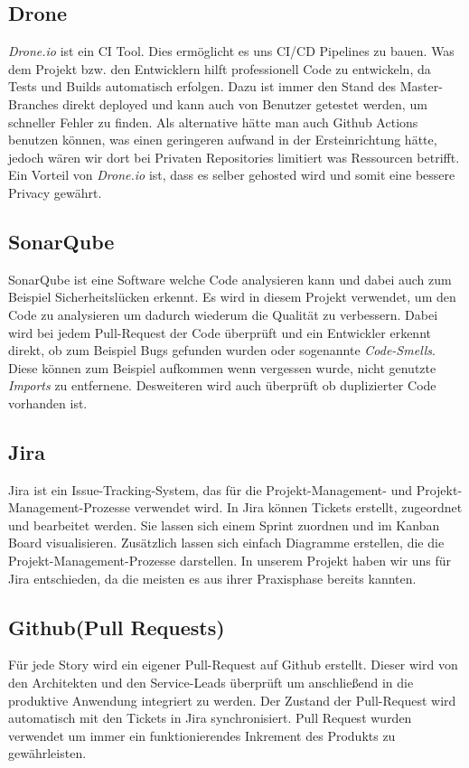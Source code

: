 \subsection{Drone}
    \textit{Drone.io} ist ein \ac{CI} Tool. Dies ermöglicht es uns \ac{CI/CD} Pipelines zu bauen. Was dem Projekt bzw. den Entwicklern hilft professionell Code zu entwickeln, da Tests und Builds automatisch erfolgen.
    Dazu ist immer den Stand des Master-Branches direkt deployed und kann auch von Benutzer getestet werden, um schneller Fehler zu finden. Als alternative hätte man auch Github Actions benutzen können, was einen geringeren
    aufwand in der Ersteinrichtung hätte, jedoch wären wir dort bei Privaten Repositories limitiert was Ressourcen betrifft. Ein Vorteil von \textit{Drone.io} ist, dass es selber gehosted wird und somit eine bessere Privacy gewährt.
\subsection{SonarQube}
    SonarQube ist eine Software welche Code analysieren kann und dabei auch zum Beispiel Sicherheitslücken erkennt.
    Es wird in diesem Projekt verwendet, um den Code zu analysieren um dadurch wiederum die Qualität zu verbessern.
    Dabei wird bei jedem Pull-Request der Code überprüft und ein Entwickler erkennt direkt, ob zum Beispiel Bugs gefunden wurden oder sogenannte \textit{Code-Smells}. 
    Diese können zum Beispiel aufkommen wenn vergessen wurde, nicht genutzte \textit{Imports} zu entfernene.
    Desweiteren wird auch überprüft ob duplizierter Code vorhanden ist.
\subsection{Jira}
    Jira ist ein Issue-Tracking-System, das für die Projekt-Management- und Projekt-Management-Prozesse verwendet wird.
    In Jira können Tickets erstellt, zugeordnet und bearbeitet werden. Sie lassen sich einem Sprint zuordnen und im Kanban Board visualisieren.
    Zusätzlich lassen sich einfach Diagramme erstellen, die die Projekt-Management-Prozesse darstellen.
    In unserem Projekt haben wir uns für Jira entschieden, da die meisten es aus ihrer Praxisphase bereits kannten.
\subsection{Github(Pull Requests)}
    Für jede Story wird ein eigener Pull-Request auf Github erstellt. Dieser wird von den Architekten und den Service-Leads überprüft um anschließend in die
    produktive Anwendung integriert zu werden. Der Zustand der Pull-Request wird automatisch mit den Tickets in Jira synchronisiert.
    Pull Request wurden verwendet um immer ein funktionierendes Inkrement des Produkts zu gewährleisten.
